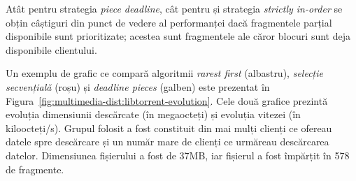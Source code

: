 Atât pentru strategia \textit{piece deadline}, cât pentru și strategia
\textit{strictly in-order} se obțin câștiguri din punct de vedere al
performanței dacă fragmentele parțial disponibile sunt prioritizate; acestea
sunt fragmentele ale căror blocuri sunt deja disponibile clientului.

Un exemplu de grafic ce compară algoritmii \textit{rarest first} (albastru),
\textit{selecție secvențială} (roșu) și \textit{deadline pieces} (galben) este
prezentat în  Figura~\ref{fig:multimedia-dist:libtorrent-evolution}.
Cele două grafice prezintă evoluția dimensiunii descărcate (în megaocteți) și
evoluția vitezei (în kiloocteți/s). Grupul folosit a fost constituit din mai
mulți clienți ce ofereau datele spre descărcare și un număr mare de clienți
ce urmăreau descărcarea datelor. Dimensiunea fișierului a fost de 37MB, iar
fișierul a fost împărțit în 578 de fragmente.



